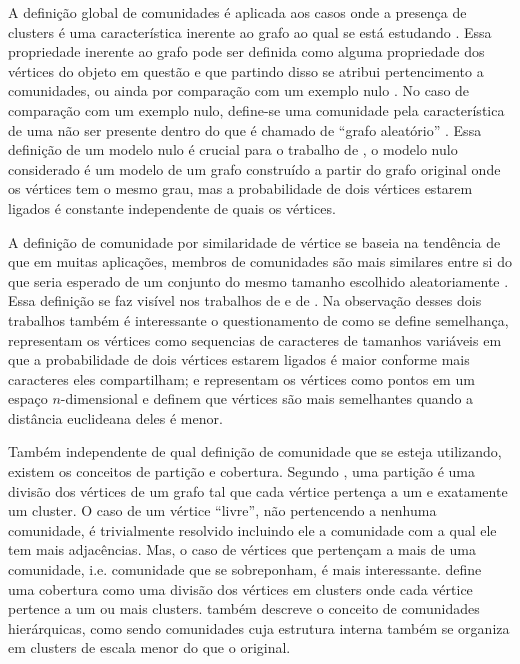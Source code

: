 \documentclass[notes.tex]{subfiles}
\begin{document}
A definição global de comunidades é aplicada aos casos onde a presença de clusters é uma característica inerente ao grafo ao qual se está estudando .
Essa propriedade inerente ao grafo pode ser definida como alguma propriedade dos vértices do objeto em questão e que partindo disso se atribui pertencimento a comunidades, ou ainda por comparação com um exemplo nulo \cite{fortunato2010community}.
No caso de comparação com um exemplo nulo, define-se uma comunidade pela característica de uma não ser presente dentro do que é chamado de ``grafo aleatório'' \cite{fortunato2010community}.
Essa definição de um modelo nulo é crucial para o trabalho de , o modelo nulo considerado é um modelo de um grafo construído a partir do grafo original onde os vértices tem o mesmo grau, mas a probabilidade de dois vértices estarem ligados é constante independente de quais os vértices.

A definição de comunidade por similaridade de vértice se baseia na tendência de que em muitas aplicações, membros de comunidades são mais similares entre si do que seria esperado de um conjunto do mesmo tamanho escolhido aleatoriamente \cite{fortunato2010community}.
Essa definição se faz visível nos trabalhos de  e de .
Na observação desses dois trabalhos também é interessante o questionamento de como se define semelhança,  representam os vértices como sequencias de caracteres de tamanhos variáveis em que a probabilidade de dois vértices estarem ligados é maior conforme mais caracteres eles compartilham; e  representam os vértices como pontos em um espaço $n$-dimensional e definem que vértices são mais semelhantes quando a distância euclideana deles é menor.

Também independente de qual definição de comunidade que se esteja utilizando, existem os conceitos de partição e cobertura.
Segundo , uma partição é uma divisão dos vértices de um grafo tal que cada vértice pertença a um e exatamente um cluster.
O caso de um vértice ``livre'', não pertencendo a nenhuma comunidade, é trivialmente resolvido incluindo ele a comunidade com a qual ele tem mais adjacências.
Mas, o caso de vértices que pertençam a mais de uma comunidade, i.e. comunidade que se sobreponham, é mais interessante.
 define uma cobertura como uma divisão dos vértices em clusters onde cada vértice pertence a um ou mais clusters.
 também descreve o conceito de comunidades hierárquicas, como sendo comunidades cuja estrutura interna também se organiza em clusters de escala menor do que o original.
\end{document}
